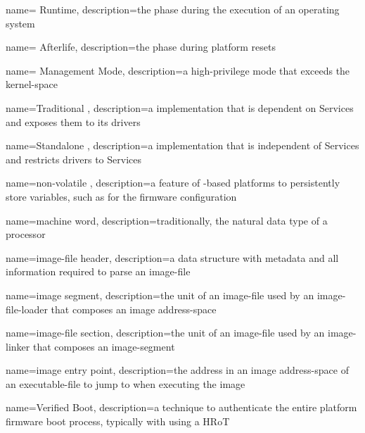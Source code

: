{
  name={ Runtime},
  description={the  phase during the execution of an operating system}
}

{
  name={ Afterlife},
  description={the  phase during platform resets}
}

{
  name={ Management Mode},
  description={a high-privilege  mode that exceeds the \gls{kernel-space}}
}

{
  name={Traditional },
  description={a  implementation that is dependent on  Services and exposes them to its drivers}
}

{
  name={Standalone },
  description={a  implementation that is independent of  Services and restricts drivers to  Services}
}

{
  name={non-volatile },
  description={a feature of -based platforms to persistently store variables, such as for the \gls{firmware} configuration}
}

{
  name={machine word},
  description={traditionally, the natural data type of a processor}
}

{
  name={\gls{image-file} header},
  description={a data structure with metadata and all information required to parse an \gls{image-file}}
}

{
  name={\gls{image} segment},
  description={the unit of an \gls{image-file} used by an \gls{image-file-loader} that composes an \gls{image} \gls{address-space}}
}

{
  name={\gls{image-file} section},
  description={the unit of an \gls{image-file} used by an \gls{image-linker} that composes an \gls{image-segment}}
}

{
  name={\gls{image} entry point},
  description={the address in an \gls{image} \gls{address-space} of an \gls{executable-file} to jump to when executing the \gls{image}}
}

{
  name={Verified Boot},
  description={a technique to authenticate the entire platform \gls{firmware} boot process, typically with using a \gls{HRoT}}
}

